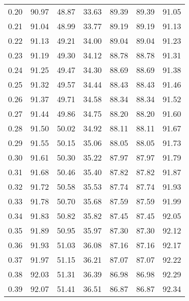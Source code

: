 \begin{tabular}{|c|c|c|c|c|c|c|}
      0.20 &     90.97 &     48.87 &      33.63 &   89.39 &      89.39 &         91.05 \\
      0.21 &     91.04 &     48.99 &      33.77 &   89.19 &      89.19 &         91.13 \\
      0.22 &     91.13 &     49.21 &      34.00 &   89.04 &      89.04 &         91.23 \\
      0.23 &     91.19 &     49.30 &      34.12 &   88.78 &      88.78 &         91.31 \\
      0.24 &     91.25 &     49.47 &      34.30 &   88.69 &      88.69 &         91.38 \\
      0.25 &     91.32 &     49.57 &      34.44 &   88.43 &      88.43 &         91.46 \\
      0.26 &     91.37 &     49.71 &      34.58 &   88.34 &      88.34 &         91.52 \\
      0.27 &     91.44 &     49.86 &      34.75 &   88.20 &      88.20 &         91.60 \\
      0.28 &     91.50 &     50.02 &      34.92 &   88.11 &      88.11 &         91.67 \\
      0.29 &     91.55 &     50.15 &      35.06 &   88.05 &      88.05 &         91.73 \\
      0.30 &     91.61 &     50.30 &      35.22 &   87.97 &      87.97 &         91.79 \\
      0.31 &     91.68 &     50.46 &      35.40 &   87.82 &      87.82 &         91.87 \\
      0.32 &     91.72 &     50.58 &      35.53 &   87.74 &      87.74 &         91.93 \\
      0.33 &     91.78 &     50.70 &      35.68 &   87.59 &      87.59 &         91.99 \\
      0.34 &     91.83 &     50.82 &      35.82 &   87.45 &      87.45 &         92.05 \\
      0.35 &     91.89 &     50.95 &      35.97 &   87.30 &      87.30 &         92.12 \\
      0.36 &     91.93 &     51.03 &      36.08 &   87.16 &      87.16 &         92.17 \\
      0.37 &     91.97 &     51.15 &      36.21 &   87.07 &      87.07 &         92.22 \\
      0.38 &     92.03 &     51.31 &      36.39 &   86.98 &      86.98 &         92.29 \\
      0.39 &     92.07 &     51.41 &      36.51 &   86.87 &      86.87 &         92.34 \\

\end{tabular}
